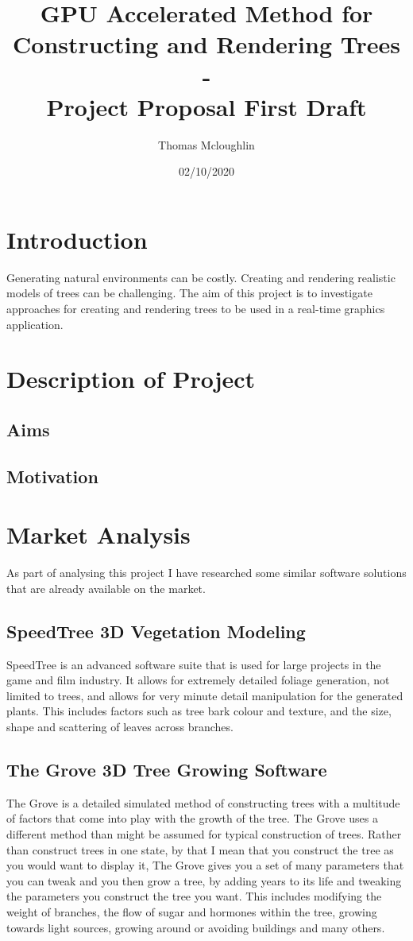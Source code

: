 \documentclass[proposal]{cmpreport}
\title{GPU Accelerated Method for Constructing and Rendering Trees 
        \\ - \\ 
        Project Proposal First Draft}
\author{Thomas Mcloughlin}
\date{02/10/2020}
\begin{document}
\maketitle

\pagebreak
\section{Introduction}
Generating natural environments can be costly. Creating and rendering realistic 
models of trees can be challenging. The aim of this project is to investigate 
approaches for creating and rendering trees to be used in a real-time graphics 
application.

\section{Description of Project}

\subsection{Aims}


\subsection{Motivation}


\section{Market Analysis}
As part of analysing this project I have researched some similar software solutions 
that are already available on the market.

\subsection{SpeedTree 3D Vegetation Modeling}
SpeedTree \cite{speedtree} is an advanced software suite that is used for large projects 
in the game and film industry. It allows for extremely detailed foliage generation, 
not limited to trees, and allows for very minute detail manipulation for the generated 
plants. This includes factors such as tree bark colour and texture, and the size, shape 
and scattering of leaves across branches.

\subsection{The Grove 3D Tree Growing Software}
The Grove \cite{thegrove} is a detailed simulated method of constructing trees with a 
multitude of factors that come into play with the growth of the tree. The Grove uses a 
different method than might be assumed for typical construction of trees. Rather than 
construct trees in one state, by that I mean that you construct the tree as you would 
want to display it, The Grove gives you a set of many parameters that you can tweak and 
you then grow a tree, by adding years to its life and tweaking the parameters you 
construct the tree you want. This includes modifying the weight of branches, the flow 
of sugar and hormones within the tree, growing towards light sources, growing around 
or avoiding buildings and many others.
\end{document}
